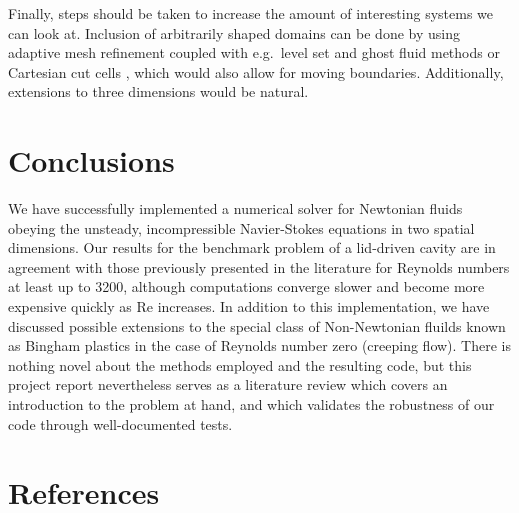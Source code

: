 \documentclass[final,3p,twocolumn]{elsarticle}
\begin{document}
Finally, steps should be taken to increase the amount of interesting
systems we can look at. Inclusion of arbitrarily shaped domains can be done by
using adaptive mesh refinement \cite{schoch2013eulerian, lovett2015adaptive}
coupled with e.g.\ level set and ghost fluid methods \cite{schoch2013eulerian}
or Cartesian cut cells \cite{klein2009well}, which would also allow for moving
boundaries.  Additionally, extensions to three dimensions would be natural. 

\section{Conclusions}
\label{sec:conclusion}

We have successfully implemented a numerical solver for Newtonian fluids
obeying the unsteady, incompressible Navier-Stokes equations in two spatial
dimensions. Our results for the benchmark problem of a lid-driven cavity are in
agreement with those previously presented in the literature for Reynolds
numbers at least up to 3200, although computations converge slower and become
more expensive quickly as Re increases.  In addition to this implementation, we
have discussed possible extensions to the special class of Non-Newtonian
fluilds known as Bingham plastics in the case of Reynolds number zero (creeping
flow). There is nothing novel about the methods employed and the resulting
code, but this project report nevertheless serves as a literature review which
covers an introduction to the problem at hand, and which validates the
robustness of our code through well-documented tests. 

\section*{References}


\end{document}
